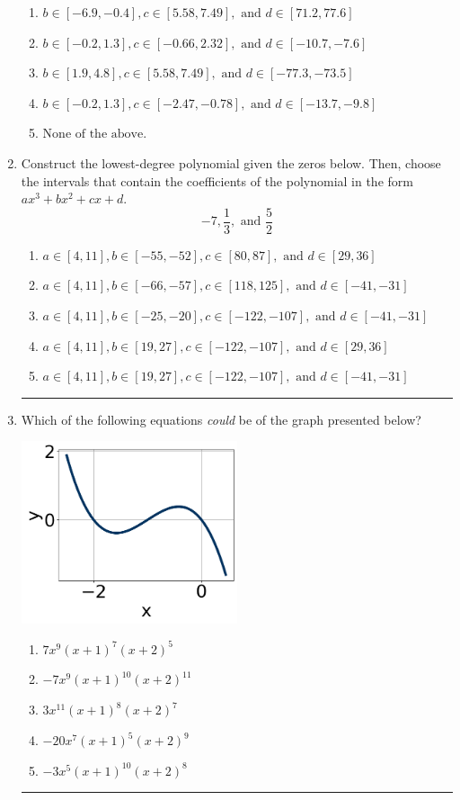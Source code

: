 \documentclass[14pt]{extbook}
\newcommand{\litem}[1]{\item#1\hspace*{-1cm}\rule{\textwidth}{0.4pt}}
\begin{document}
\begin{enumerate}
{\begin{enumerate}[label=\Alph*.]
\item \( b \in [-6.9, -0.4], c \in [5.58, 7.49], \text{ and } d \in [71.2, 77.6] \)
\item \( b \in [-0.2, 1.3], c \in [-0.66, 2.32], \text{ and } d \in [-10.7, -7.6] \)
\item \( b \in [1.9, 4.8], c \in [5.58, 7.49], \text{ and } d \in [-77.3, -73.5] \)
\item \( b \in [-0.2, 1.3], c \in [-2.47, -0.78], \text{ and } d \in [-13.7, -9.8] \)
\item \( \text{None of the above.} \)

\end{enumerate} }
\litem{
Construct the lowest-degree polynomial given the zeros below. Then, choose the intervals that contain the coefficients of the polynomial in the form $ax^3+bx^2+cx+d$.\[ -7, \frac{1}{3}, \text{ and } \frac{5}{2} \]\begin{enumerate}[label=\Alph*.]
\item \( a \in [4, 11], b \in [-55, -52], c \in [80, 87], \text{ and } d \in [29, 36] \)
\item \( a \in [4, 11], b \in [-66, -57], c \in [118, 125], \text{ and } d \in [-41, -31] \)
\item \( a \in [4, 11], b \in [-25, -20], c \in [-122, -107], \text{ and } d \in [-41, -31] \)
\item \( a \in [4, 11], b \in [19, 27], c \in [-122, -107], \text{ and } d \in [29, 36] \)
\item \( a \in [4, 11], b \in [19, 27], c \in [-122, -107], \text{ and } d \in [-41, -31] \)

\end{enumerate} }
\litem{
Which of the following equations \textit{could} be of the graph presented below?
\begin{center}
    \includegraphics[width=0.5\textwidth]{../Figures/polyGraphToFunctionCopyB.png}
\end{center}
\begin{enumerate}[label=\Alph*.]
\item \( 7x^{9} (x + 1)^{7} (x + 2)^{5} \)
\item \( -7x^{9} (x + 1)^{10} (x + 2)^{11} \)
\item \( 3x^{11} (x + 1)^{8} (x + 2)^{7} \)
\item \( -20x^{7} (x + 1)^{5} (x + 2)^{9} \)
\item \( -3x^{5} (x + 1)^{10} (x + 2)^{8} \)


\end{enumerate}}
\end{enumerate}
\end{document}
